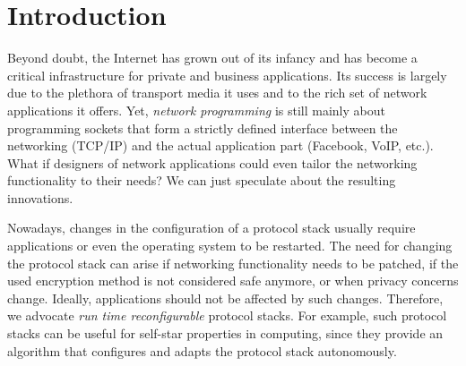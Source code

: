 \documentclass{sig-alternate}
\begin{document}



\section{Introduction}
Beyond doubt, the Internet has grown out of its infancy and has become a
critical infrastructure for private and business applications. Its success is
largely due to the plethora of transport media 
it uses and to the rich set of network applications 
it offers. Yet, \emph{network programming} is still
mainly about programming sockets that form a strictly defined interface between
the networking (TCP/IP) and the actual application part (Facebook, VoIP, etc.).
What if designers of network applications could even tailor the networking
functionality to their needs? We can just speculate about the resulting
innovations. 

Nowadays, changes in the configuration of a protocol stack usually require
applications or even the operating system to be restarted.  The need for
changing the protocol stack can arise if networking functionality needs to be
patched, if the used encryption method is not considered safe anymore, or when
privacy concerns change. Ideally, applications should not be affected by such
changes.  Therefore, we advocate \textit{run time reconfigurable} protocol
stacks. For example, such protocol stacks can be useful for self-star
properties in computing, since they provide an algorithm that configures and
adapts the protocol stack autonomously.


\end{document}
